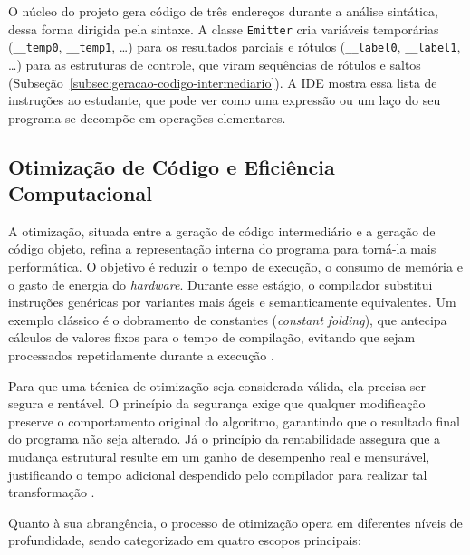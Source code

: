 O núcleo do projeto gera código de três endereços durante a análise sintática, dessa forma dirigida pela sintaxe. A classe \texttt{Emitter} cria variáveis temporárias (\texttt{\_\_temp0}, \texttt{\_\_temp1}, \ldots) para os resultados parciais e rótulos (\texttt{\_\_label0}, \texttt{\_\_label1}, \ldots) para as estruturas de controle, que viram sequências de rótulos e saltos (Subseção~\ref{subsec:geracao-codigo-intermediario}). A IDE mostra essa lista de instruções ao estudante, que pode ver como uma expressão ou um laço do seu programa se decompõe em operações elementares.

\subsection{Otimização de Código e Eficiência Computacional}

A otimização, situada entre a geração de código intermediário e a geração de código objeto, refina a representação interna do programa para torná-la mais performática. O objetivo é reduzir o tempo de execução, o consumo de memória e o gasto de energia do \textit{hardware}. Durante esse estágio, o compilador substitui instruções genéricas por variantes mais ágeis e semanticamente equivalentes. Um exemplo clássico é o dobramento de constantes (\textit{constant folding}), que antecipa cálculos de valores fixos para o tempo de compilação, evitando que sejam processados repetidamente durante a execução \cite{aho1995,cooper2012}.

Para que uma técnica de otimização seja considerada válida, ela precisa ser segura e rentável. O princípio da segurança exige que qualquer modificação preserve o comportamento original do algoritmo, garantindo que o resultado final do programa não seja alterado. Já o princípio da rentabilidade assegura que a mudança estrutural resulte em um ganho de desempenho real e mensurável, justificando o tempo adicional despendido pelo compilador para realizar tal transformação \cite{price2001}.

Quanto à sua abrangência, o processo de otimização opera em diferentes níveis de profundidade, sendo categorizado em quatro escopos principais:

